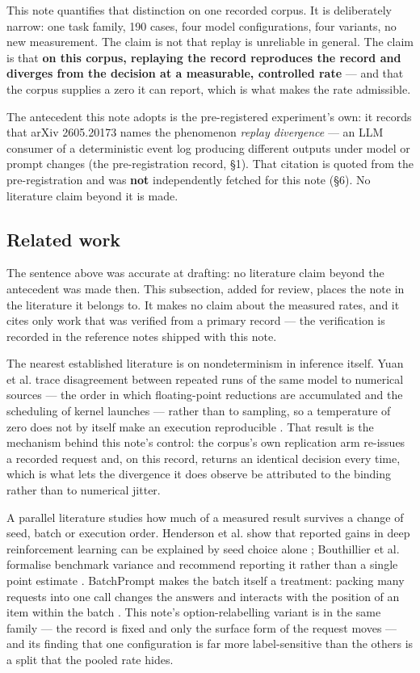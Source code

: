 \documentclass[10pt]{article}
\begin{document}
This note quantifies that distinction on one recorded corpus. It is deliberately narrow: one task family, 190 cases, four model configurations, four variants, no new measurement. The claim is not that replay is unreliable in general. The claim is that \textbf{on this corpus, replaying the record reproduces the record and diverges from the decision at a measurable, controlled rate} --- and that the corpus supplies a zero it can report, which is what makes the rate admissible.

The antecedent this note adopts is the pre-registered experiment's own: it records that arXiv 2605.20173 names the phenomenon \emph{replay divergence} --- an LLM consumer of a deterministic event log producing different outputs under model or prompt changes (the pre-registration record, \S1). That citation is quoted from the pre-registration and was \textbf{not} independently fetched for this note (\S6). No literature claim beyond it is made.

\subsection{Related work}

The sentence above was accurate at drafting: no literature claim beyond the antecedent was made then. This subsection, added for review, places the note in the literature it belongs to. It makes no claim about the measured rates, and it cites only work that was verified from a primary record --- the verification is recorded in the reference notes shipped with this note.

The nearest established literature is on nondeterminism in inference itself. Yuan et al. trace disagreement between repeated runs of the same model to numerical sources --- the order in which floating-point reductions are accumulated and the scheduling of kernel launches --- rather than to sampling, so a temperature of zero does not by itself make an execution reproducible \cite{yuanNondeterminism}. That result is the mechanism behind this note's control: the corpus's own replication arm re-issues a recorded request and, on this record, returns an identical decision every time, which is what lets the divergence it does observe be attributed to the binding rather than to numerical jitter.

A parallel literature studies how much of a measured result survives a change of seed, batch or execution order. Henderson et al. show that reported gains in deep reinforcement learning can be explained by seed choice alone \cite{hendersonDeepRL}; Bouthillier et al. formalise benchmark variance and recommend reporting it rather than a single point estimate \cite{bouthillierVariance}. BatchPrompt makes the batch itself a treatment: packing many requests into one call changes the answers and interacts with the position of an item within the batch \cite{linBatchPrompt}. This note's option-relabelling variant is in the same family --- the record is fixed and only the surface form of the request moves --- and its finding that one configuration is far more label-sensitive than the others is a split that the pooled rate hides.
\end{document}
